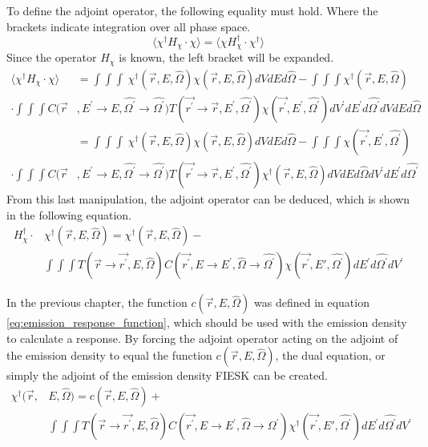 To define the adjoint operator, the following equality must hold. Where the 
brackets indicate integration over all phase space.
\begin{equation*}
  \langle \chi^{\dagger}H_{\chi} \cdot \chi \rangle = 
  \langle \chi H_{\chi}^{\dagger} \cdot \chi^{\dagger} \rangle
\end{equation*}
Since the operator $H_{\chi}$ is known, the left bracket will be expanded.
\begin{align}
  \langle \chi^{\dagger}H_{\chi} \cdot \chi \rangle & =
  \int\int\int \
  \chi^{\dagger}(\vec{r},E,\hat{\Omega}) \chi(\vec{r},E,\hat{\Omega})
  dV dE d\hat{\Omega} - \int\int\int \chi^{\dagger}(\vec{r},E,\hat{\Omega}) 
  \nonumber \\
  \cdot \int\int\int 
  C(\vec{r}&,E^{'} \to E, \hat{\Omega^{'}} \to \hat{\Omega^{'}})
  T(\vec{r^{'}} \to \vec{r},E^{'},\hat{\Omega^{'}})
  \chi(\vec{r^{'}},E^{'},\hat{\Omega^{'}}) dV^{'}dE^{'}d\hat{\Omega^{'}}
  dV dE d\hat{\Omega} \nonumber \\
  & = \int\int\int \
  \chi^{\dagger}(\vec{r},E,\hat{\Omega}) \chi(\vec{r},E,\hat{\Omega})
  dV dE d\hat{\Omega} - \int\int\int \chi(\vec{r^{'}},E^{'},\hat{\Omega^{'}}) 
  \nonumber \\
  \cdot \int\int\int 
  C(\vec{r}&,E^{'} \to E, \hat{\Omega^{'}} \to \hat{\Omega^{'}})
  T(\vec{r^{'}} \to \vec{r},E^{'},\hat{\Omega^{'}})
  \chi^{\dagger}(\vec{r},E,\hat{\Omega}) dV dE d\hat{\Omega}
  dV^{'}dE^{'}d\hat{\Omega^{'}}
\end{align}
From this last manipulation, the adjoint operator can be deduced, which is 
shown in the following equation.
\begin{equation}
  \begin{split}
    H_{\chi}^{\dagger} \cdot &\chi^{\dagger}(\vec{r},E,\hat{\Omega}) = 
    \chi^{\dagger}(\vec{r},E,\hat{\Omega}) - \\
    & \int\int\int T(\vec{r} \to \vec{r^{'}},E,\hat{\Omega}) 
    C(\vec{r^{'}},E \to E^{'},\hat{\Omega} \to \hat{\Omega^{'}})
    \chi(\vec{r^{'}},E',\hat{\Omega^{'}}) dE^{'}d\hat{\Omega^{'}}dV^{'}
  \end{split}
\end{equation}

In the previous chapter, the function $c(\vec{r},E,\hat{\Omega})$ was defined 
in equation \ref{eq:emission_response_function}, which should be used with 
the emission density to calculate a response. By forcing the adjoint 
operator acting on the adjoint of the emission density to equal the 
function $c(\vec{r},E,\hat{\Omega})$, the dual equation, or simply the adjoint
of the emission density FIESK can be created.
\begin{equation}
  \begin{split}
    \chi^{\dagger}(\vec{r},&E,\hat{\Omega}) = c(\vec{r},E,\hat{\Omega}) + \\
    &\int\int\int T(\vec{r} \to \vec{r^{'}},E,\hat{\Omega}) 
    C(\vec{r^{'}},E \to E^{'},\hat{\Omega} \to \hat{\Omega^{'}})
    \chi^{\dagger}(\vec{r^{'}},E',\hat{\Omega^{'}}) dE^{'}d\hat{\Omega^{'}}dV^{'}
  \end{split}
  \label{eq:adjoint_of_emission_density_integral_eqn}
\end{equation}

